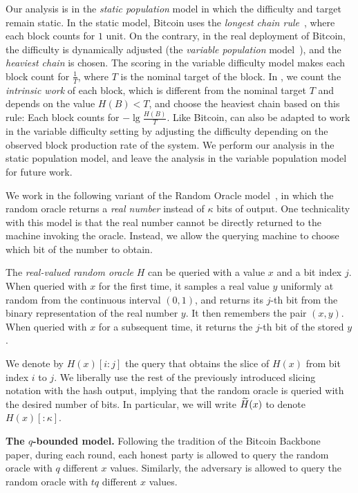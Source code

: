 \noindent
{}
Our analysis is in the \emph{static population} model in which the difficulty
and target remain static. In the static model, Bitcoin uses the \emph{longest chain rule}~\cite{backbone},
where each block counts for $1$ unit.
On the contrary, in the real deployment of Bitcoin, the difficulty is dynamically adjusted (the
\emph{variable population} model~\cite{varbackbone}), and the \emph{heaviest chain} is chosen.
The scoring in the variable difficulty model makes each block count for $\frac{1}{T}$, where
$T$ is the nominal target of the block. In \poem, we count the \emph{intrinsic work}
of each block, which is different from the nominal target $T$ and depends on the value $H(B) < T$,
and choose the heaviest chain based on this rule: Each block counts for $-\lg\frac{H(B)}{T}$.
Like Bitcoin, \poem can also be adapted to work in the variable difficulty setting by adjusting
the difficulty depending on the observed block production rate of the system.
We perform our analysis in the static population model, and leave the analysis in the variable
population model for future work.

We work in the following variant of the Random Oracle model~\cite{ro}, in which
the random oracle returns a \emph{real number} instead of $\kappa$ bits of output.
One technicality with this model is that the real number cannot be directly returned
to the machine invoking the oracle. Instead, we allow the querying machine to choose which
bit of the number to obtain.

\begin{definition}
  The \emph{real-valued random oracle} $H$ can be queried with a value $x$ and a bit index $j$.
  When queried with $x$ for the first time,
  it samples a real value $y$ uniformly at random from the continuous interval $(0, 1)$,
  and returns its $j$-th bit from the binary representation of the real number $y$.
  It then remembers the pair $(x, y)$.
  When queried with $x$ for a subsequent time, it returns the $j$-th bit
  of the stored $y$.
\end{definition}

We denote by $H(x)[{i}{:}{j}]$ the query that obtains the slice of $H(x)$ from bit index $i$ to $j$.
We liberally use the rest of the previously introduced slicing notation with the hash output,
implying that the random oracle is queried with the desired number of bits.
In particular, we will write $\widetilde{H}(x)$ to denote $H(x)[{:}{\kappa}]$.

\noindent
\textbf{The $q$-bounded model.}
Following the tradition of the Bitcoin Backbone~\cite{backbone} paper,
during each round, each honest party is allowed to query the random oracle with $q$
different $x$ values. Similarly, the adversary is allowed to query the random oracle
with $t q$ different $x$ values.